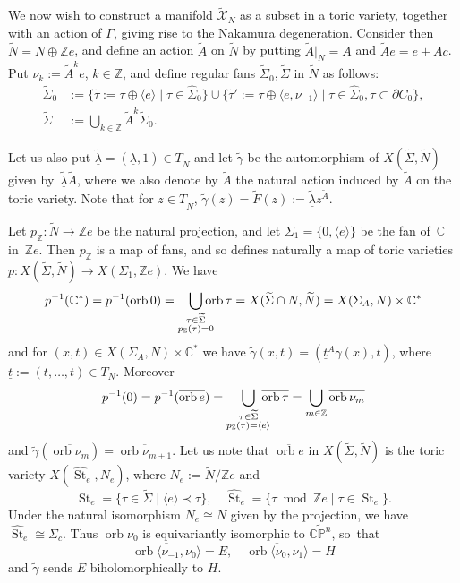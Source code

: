 \documentclass[JEP,XML,SOM,Unicode,NoFloatCountersInSection]{cedram}
\let\mathcal\mathscr
\theoremstyle{definition}
\let\wt\widetilde
\DeclareMathOperator{\St}{St}
\let\la\lambda
\let\del\partial
\let\ov\overline
\let\un\underline
\newcommand{\CC}{\mathbb{C}}
\newcommand{\PP}{\mathbb{P}}
\newcommand{\ZZ}{\mathbb{Z}}
\DeclareMathOperator{\orb}{orb}
\begin{document}
We now wish to construct a manifold $\wt{\mathcal{X}}_N$ as a subset in a toric variety, together with an action of $\Gamma$, giving rise to the Nakamura degeneration. Consider then $\wt{N}=N\oplus \ZZ e$, and define an action $\wt{A}$ on $\wt{N}$ by putting $\wt{A}|_N=A$ and $\wt{A}e=e+Ac$. Put $\nu_k:=\wt{A}^ke$, $k\in\ZZ$, and define regular fans $\wt{\Sigma}_0,\wt{\Sigma}$ in $\wt{N}$ as follows:\vspace*{-3pt}
\begin{align*}
\wt{\Sigma}_0&:=\{\wt{\tau}:=\tau\oplus\langle e\rangle \mid \tau\in\hat\Sigma_0\}\cup\{\wt{\tau}':=\tau\oplus\langle e,\nu_{-1}\rangle\mid \tau\in\hat\Sigma_0, \tau\subset \del C_0\},\\
\wt{\Sigma}&:=\bigcup_{k\in\ZZ}\wt{A}^k\wt{\Sigma}_0.
\end{align*}

Let us also put $\wt{\un\la}=(\un\la,1)\in T_{\wt{N}}$ and let $\wt{\gamma}$ be the automorphism of $X(\wt{\Sigma},\wt{N})$ given by~$\wt{\un\la}\wt{A}$, where we also denote by $\wt{A}$ the natural action induced by $\wt{A}$ on the toric variety. Note that for $z\in T_{\wt{N}}$, $\wt{\gamma}(z)=\wt{F}(z):=\wt{\un\la} z^{\wt{A}}$.

Let $p_\ZZ:\wt{N}\to \ZZ e$ be the natural projection, and let $\Sigma_1=\{0,\langle e\rangle \}$ be the fan of~$\CC$ in~$\ZZ e$. Then $p_\ZZ$ is a map of fans, and so defines naturally a map of toric varieties $p:X(\wt{\Sigma},\wt{N})\to X(\Sigma_1,\ZZ e)$. We have
\[
p^{-1}(\CC^*)=p^{-1}(\orb 0)=\bigcup_{\substack{\tau\in \wt{\Sigma}\\ p_\ZZ(\tau)=0}}\hspace*{-3mm}\orb\tau=X(\wt{\Sigma}\cap N, \wt{N})=X(\Sigma_A,N)\times\CC^*
\]
and for $(x,t)\!\in\! X(\Sigma_A,N)\times\CC^*$ we have $\wt{\gamma}(x,t)\!=\!(\un t^A\gamma(x),t)$, where \hbox{$\un t:=(t,\ldots, t)\!\in\!T_N$}. Moreover\vspace*{-3pt}
\[
p^{-1}(0)=p^{-1}(\ov{\orb e})=\bigcup_{\substack{\tau\in\wt{\Sigma}\\ p_\ZZ(\tau)=\langle e\rangle}}\hspace*{-3mm} \overline{\orb\tau}=\bigcup_{m\in\ZZ}\overline{\orb\nu_m}
\]
and $\wt{\gamma}(\ov{\orb\nu_m})=\ov{\orb \nu_{m+1}}$. Let us note that $\ov{\orb e}$ in $X(\tilde\Sigma,\tilde N)$ is the toric variety $X(\widehat{\St}_{e}, N_{e})$, where $N_{e}:=\wt{N}/\ZZ e$ and
\begin{equation*}
\St_{e}=\{\tau\in\wt{\Sigma} \mid \langle e\rangle\prec \tau\}, \quad\widehat{\St}_e=\{\tau \bmod \ZZ e\mid \tau\in \St_e\}.
\end{equation*}
Under the natural isomorphism $N_e\!\cong\!N$ given by the projection, we have $\widehat{\St}_e\cong \Sigma_c$. Thus $\ov{\orb \nu_0}$ is equivariantly isomorphic to $\widetilde{\CC\PP^n}$, so~that
\[
\ov{\orb\langle \nu_{-1},\nu_0\rangle}=E, \quad\ov{\orb \langle \nu_0,\nu_1\rangle}=H
\]
and $\wt{\gamma}$ sends $E$ biholomorphically to $H$.
\end{document}
